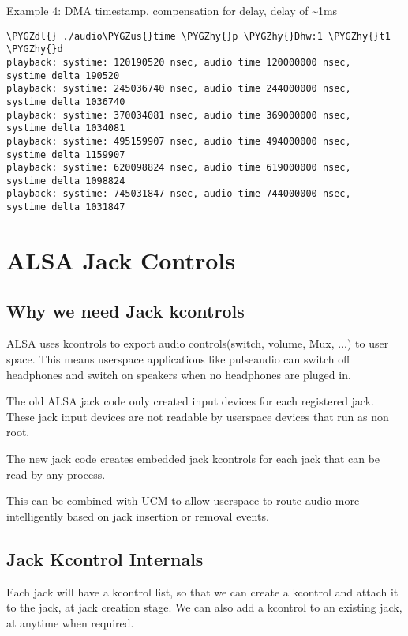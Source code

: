 \documentclass[a4paper,8pt,english]{sphinxmanual}
\def\PYGZus{\char`\_}
\def\PYGZdl{\char`\$}
\def\PYGZhy{\char`\-}
\begin{document}
Example 4: DMA timestamp, compensation for delay, delay of \textasciitilde{}1ms

\begin{Verbatim}[commandchars=\\\{\}]
\PYGZdl{} ./audio\PYGZus{}time \PYGZhy{}p \PYGZhy{}Dhw:1 \PYGZhy{}t1 \PYGZhy{}d
playback: systime: 120190520 nsec, audio time 120000000 nsec,         systime delta 190520
playback: systime: 245036740 nsec, audio time 244000000 nsec,         systime delta 1036740
playback: systime: 370034081 nsec, audio time 369000000 nsec,         systime delta 1034081
playback: systime: 495159907 nsec, audio time 494000000 nsec,         systime delta 1159907
playback: systime: 620098824 nsec, audio time 619000000 nsec,         systime delta 1098824
playback: systime: 745031847 nsec, audio time 744000000 nsec,         systime delta 1031847
\end{Verbatim}


\section{ALSA Jack Controls}
\label{sound/designs/jack-controls:alsa-jack-controls}\label{sound/designs/jack-controls::doc}

\subsection{Why we need Jack kcontrols}
\label{sound/designs/jack-controls:why-we-need-jack-kcontrols}
ALSA uses kcontrols to export audio controls(switch, volume, Mux, ...)
to user space. This means userspace applications like pulseaudio can
switch off headphones and switch on speakers when no headphones are
pluged in.

The old ALSA jack code only created input devices for each registered
jack. These jack input devices are not readable by userspace devices
that run as non root.

The new jack code creates embedded jack kcontrols for each jack that
can be read by any process.

This can be combined with UCM to allow userspace to route audio more
intelligently based on jack insertion or removal events.


\subsection{Jack Kcontrol Internals}
\label{sound/designs/jack-controls:jack-kcontrol-internals}
Each jack will have a kcontrol list, so that we can create a kcontrol
and attach it to the jack, at jack creation stage. We can also add a
kcontrol to an existing jack, at anytime when required.
\end{document}
